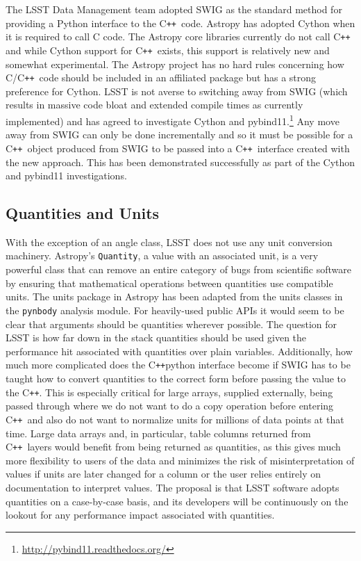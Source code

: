 \documentclass[]{spie}  %
\newcommand{\CPP}{C\texttt{++}\xspace}  %
\begin{document}
The LSST Data Management team adopted SWIG as the standard method for providing a Python interface to the \CPP\ code.
Astropy has adopted Cython\cite{2010/content/aip/journal/cise/13/2/10.1109/MCSE.2010.118} when it is required to call C code.
The Astropy core libraries currently do not call \CPP\, and while Cython support for \CPP\ exists, this support is relatively new and somewhat experimental.
The Astropy project has no hard rules concerning how C/\CPP\ code should be included in an affiliated package but has a strong preference for Cython.
LSST is not averse to switching away from SWIG (which results in massive code bloat and extended compile times as currently implemented) and has agreed to investigate Cython\cite{dmtn-013} and pybind11.\cite{dmtn-014}\footnote{\url{http://pybind11.readthedocs.org/}}
Any move away from SWIG can only be done incrementally and so it must be possible for a \CPP\ object produced from SWIG to be passed into a \CPP\ interface created with the new approach.
This has been demonstrated successfully as part of the Cython and pybind11 investigations.

\subsection{Quantities and Units}

With the exception of an angle class, LSST does not use any unit conversion machinery.
Astropy's \texttt{Quantity}, a value with an associated unit, is a very powerful class that can remove an entire category of bugs from scientific software by ensuring that mathematical operations between quantities use compatible units.
The units package in Astropy has been adapted from the units classes in the \texttt{pynbody} analysis module\cite{pynbody}.
For heavily-used public APIs it would seem to be clear that arguments should be quantities wherever possible.
The question for LSST is how far down in the stack quantities should be used given the performance hit associated with quantities over plain variables.
Additionally, how much more complicated does the \CPP\/python interface become if SWIG has to be taught how to convert quantities to the correct form before passing the value to the \CPP.
This is especially critical for large arrays, supplied externally, being passed through where we do not want to do a copy operation before entering \CPP\ and also do not want to normalize units for millions of data points at that time.
Large data arrays and, in particular, table columns returned from \CPP\ layers would benefit from being returned as quantities, as this gives much more flexibility to users of the data and minimizes the risk of misinterpretation of values if units are later changed for a column or the user relies entirely on documentation to interpret values.
The proposal is that LSST software adopts quantities on a case-by-case basis, and its developers will be continuously on the lookout for any performance impact associated with quantities.
\end{document}
